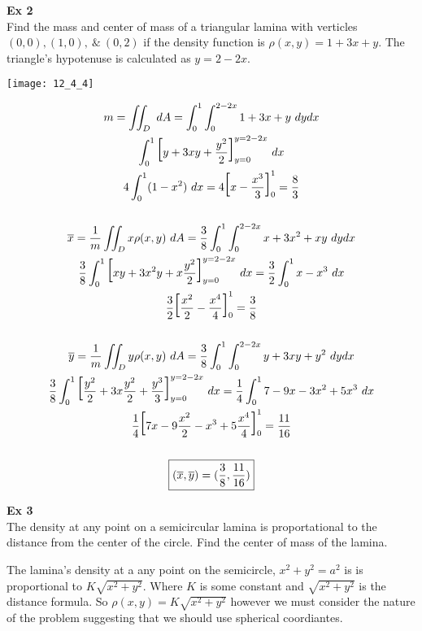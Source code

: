 \documentclass{article}
\begin{document}
  \textbf{Ex 2}\\
  Find the mass and center of mass of a triangular lamina with verticles $ (0,0), (1,0), ~\&~ (0,2) $ if the density function is $ \rho(x,y)=1+3x+y $. The triangle's hypotenuse is calculated as $ y=2-2x $.
  \begin{center}
    \texttt{[image: 12\_4\_4]}
  \end{center}

  \[
    \begin{gathered}
    m=\iint_D~dA = \int^{1}_{0} \int^{2-2x}_{0} 1+3x+y ~ dydx\\
   \int^{1}_{0} \text{\huge{[}} y+3xy+\frac{y^{2}}{2} \text{\huge{]}}^{y=2-2x}_{y=0}~dx\\
   4 \int^{1}_{0} (1-x^{2})~dx=4 \text{\huge{[}} x-\frac{x^{3}}{3} \text{\huge{]}}^{1}_0=\frac{8}{3}\\
   ~\\
   \overline{x}=\frac{1}{m}\iint_D x\rho(x,y)~dA=\frac{3}{8} \int^{1}_{0} \int^{2-2x}_{0} x+3x^{2}+xy ~ dydx\\
   \frac{3}{8} \int^{1}_{0} \text{\huge{[}} xy+3x^{2}y+x\frac{y^{2}}{2} \text{\huge{]}}^{y=2-2x}_{y=0}~dx= \frac{3}{2} \int^{1}_{0} x-x^{3}~dx\\
   \frac{3}{2} \text{\huge{[}} \frac{x^{2}}{2}-\frac{x^{4}}{4} \text{\huge{]}}^{1}_0=\frac{3}{8}\\
   ~\\
   \overline{y}=\frac{1}{m} \iint_D y\rho(x,y)~dA=\frac{3}{8} \int^{1}_{0} \int^{2-2x}_{0} y+3xy+y^{2} ~ dydx\\
   \frac{3}{8} \int^{1}_{0} \text{\huge{[}} \frac{y^{2}}{2}+3x\frac{y^{2}}{2}+\frac{y^{3}}{3} \text{\huge{]}}^{y=2-2x}_{y=0}~dx=\frac{1}{4} \int^{1}_{0} 7-9x-3x^{2}+5x^{3}~dx\\
   \frac{1}{4}\text{\huge{[}} 7x-9\frac{x^{2}}{2}-x^{3}+5\frac{x^{4}}{4} \text{\huge{]}}^{1}_{0}=\frac{11}{16}\\
   ~\\
   \boxed{(\overline{x},\overline{y})=(\frac{3}{8},\frac{11}{16})} 
    \end{gathered}
  \]

  \textbf{Ex 3}\\
  The density at any point on a semicircular lamina is proportational to the distance from the center of the circle. Find the center of mass of the lamina.

  The lamina's density at a any point on the semicircle, $ x^{2}+y^{2}=a^{2} $ is is proportional to $ K\sqrt{x^{2}+y^{2}} $. Where $ K $ is some constant and $ \sqrt{x^{2}+y^{2}} $ is the distance formula. So $ \rho(x,y)=K\sqrt{x^{2}+y^{2}} $ however we must consider the nature of the problem suggesting that we should use spherical coordiantes.
\end{document}
